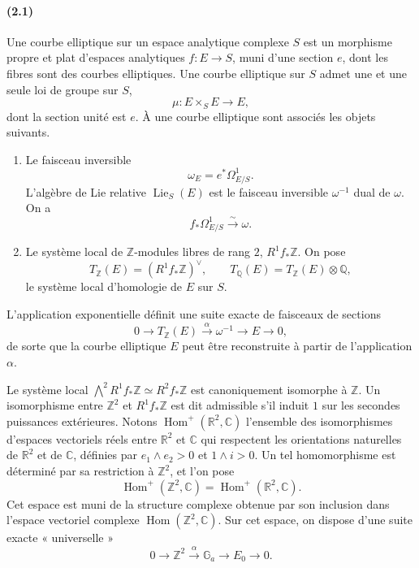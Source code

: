 \documentclass[10pt]{article}
\newcommand{\C}{\mathbb C}
\newcommand{\Q}{\mathbb Q}
\newcommand{\R}{\mathbb R}
\newcommand{\Z}{\mathbb Z}
\newcommand{\Ga}{\mathbb G_a}
\newcommand{\Hom}{\operatorname{Hom}}
\newcommand{\Lie}{\operatorname{Lie}}
\begin{document}
\paragraph{(2.1)}
Une courbe elliptique sur un espace analytique complexe $S$ est un morphisme propre et
plat d'espaces analytiques $f:E\to S$, muni d'une section $e$, dont les fibres sont des
courbes elliptiques. Une courbe elliptique sur $S$ admet une et une seule loi de groupe sur
$S$,
\[
\mu:E\times_S E\to E,
\]
dont la section unité est $e$. À une courbe elliptique sont associés les objets suivants.

\begin{enumerate}[label=(\alph*)]
\item Le faisceau inversible
\[
\omega_E=e^*\Omega^1_{E/S}.
\]
L'algèbre de Lie relative $\Lie_S(E)$ est le faisceau inversible $\omega^{-1}$ dual de
$\omega$. On a
\[
f_*\Omega^1_{E/S}\xrightarrow{\sim}\omega .
\]

\item Le système local de $\Z$-modules libres de rang $2$, $R^1f_*\Z$. On pose
\[
T_\Z(E)=(R^1f_*\Z)^\vee,\qquad
T_\Q(E)=T_\Z(E)\otimes\Q,
\]
le système local d'homologie de $E$ sur $S$.
\end{enumerate}

L'application exponentielle définit une suite exacte de faisceaux de sections
\[
0\longrightarrow T_\Z(E)\xrightarrow{\alpha}\omega^{-1}\longrightarrow E\longrightarrow 0,
\]
de sorte que la courbe elliptique $E$ peut être reconstruite à partir de l'application
$\alpha$.

Le système local $\bigwedge^2 R^1f_*\Z\simeq R^2f_*\Z$ est canoniquement isomorphe
à $\Z$. Un isomorphisme entre $\Z^2$ et $R^1f_*\Z$ est dit admissible s'il induit $1$ sur
les secondes puissances extérieures. Notons $\Hom^+(\R^2,\C)$ l'ensemble des
isomorphismes d'espaces vectoriels réels entre $\R^2$ et $\C$ qui respectent les orientations
naturelles de $\R^2$ et de $\C$, définies par $e_1\wedge e_2>0$ et $1\wedge i>0$.
Un tel homomorphisme est déterminé par sa restriction à $\Z^2$, et l'on pose
\[
\Hom^+(\Z^2,\C)=\Hom^+(\R^2,\C).
\]
Cet espace est muni de la structure complexe obtenue par son inclusion dans l'espace
vectoriel complexe $\Hom(\Z^2,\C)$. Sur cet espace, on dispose d'une suite exacte
« universelle »
\[
0\longrightarrow \Z^2\xrightarrow{\alpha}\Ga\longrightarrow E_0\longrightarrow 0.
\]
\end{document}
